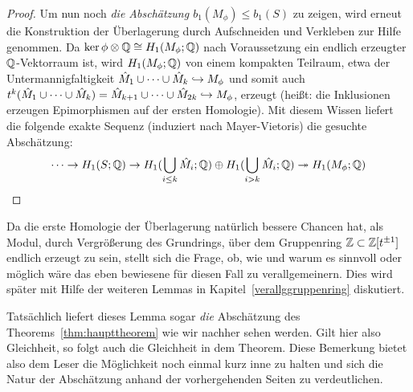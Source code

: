 \begin{proof}
	  Um nun noch\emph{ die Abschätzung $b_1(M_\phi) \leq b_1(S)$ }zu zeigen, wird erneut die Konstruktion der Überlagerung durch Aufschneiden und Verkleben zur Hilfe genommen. Da $\ker\phi \otimes \mathbb{Q} \cong H_1(M_\phi;\mathbb{Q})$ nach Voraussetzung ein endlich erzeugter $\mathbb{Q}$-Vektorraum ist, wird $H_1(M_\phi;\mathbb{Q})$ von einem kompakten Teilraum, etwa der Untermannigfaltigkeit $\hat M_1 \cup \cdots \cup \hat M_k \hookrightarrow M_\phi$ und somit auch $t^k(\hat M_1 \cup \cdots \cup \hat M_k )  = \hat M_{k+1} \cup \cdots \cup \hat M_{2k}\hookrightarrow M_\phi$, erzeugt (heißt: die Inklusionen erzeugen Epimorphismen auf der ersten Homologie). Mit diesem Wissen liefert die folgende exakte Sequenz (induziert nach Mayer-Vietoris) die gesuchte Abschätzung:
	  \[
	  	\cdots \to H_1(S;\mathbb{Q}) \to H_1(\bigcup_{i\leq k}\hat M_i;\mathbb{Q}) \oplus H_1(\bigcup_{i>k} \hat M_i;\mathbb{Q}) \twoheadrightarrow H_1(M_\phi;\mathbb{Q})
	  \]
\end{proof}

\begin{bem}
Da die erste Homologie der Überlagerung natürlich bessere Chancen hat, als Modul, durch Vergrößerung des Grundrings, über dem Gruppenring $\mathbb{Z}\subset \mathbb{Z}[t^{\pm 1}]$ endlich erzeugt zu sein, stellt sich die Frage, ob, wie und warum es sinnvoll oder möglich wäre das eben bewiesene für diesen Fall zu verallgemeinern. Dies wird später mit Hilfe der weiteren Lemmas in Kapitel~\ref{verallggruppenring} diskutiert. 
\end{bem}
\begin{bem}
	Tatsächlich liefert dieses Lemma sogar \emph{die} Abschätzung des Theorems~\ref{thm:haupttheorem} wie wir nachher sehen werden. Gilt hier also Gleichheit, so folgt auch die Gleichheit in dem Theorem. Diese Bemerkung bietet also dem Leser die Möglichkeit noch einmal kurz inne zu halten und sich die Natur der Abschätzung anhand der vorhergehenden Seiten zu verdeutlichen.
\end{bem}

